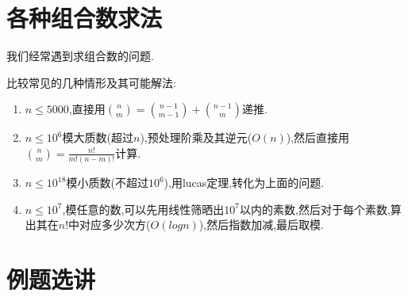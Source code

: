 \documentclass{beamer}
\begin{document}
	\section{各种组合数求法}
		\begin{frame}
			我们经常遇到求组合数的问题.
			
			\pause
			
			比较常见的几种情形及其可能解法:
			\begin{enumerate}
				\item $n \leq 5000$,直接用$\binom{n}{m} = \binom{n-1}{m-1} + \binom{n-1}{m}$递推.
				\item $n \leq 10^6$模大质数(超过$n$),预处理阶乘及其逆元($O(n)$),然后直接用$\binom{n}{m} = \frac{n!}{m!(n-m)!}$计算.
				\item $n \leq 10^{18}$模小质数(不超过$10^6$),用lucas定理,转化为上面的问题.
				\item $n \leq 10^7$,模任意的数,可以先用线性筛晒出$10^7$以内的素数,然后对于每个素数,算出其在$n!$中对应多少次方($O(logn)$),然后指数加减,最后取模.
			\end{enumerate}
		\end{frame}	
		
		\section{例题选讲}
			\begin{frame}
				
			\end{frame}
		
\end{document}
